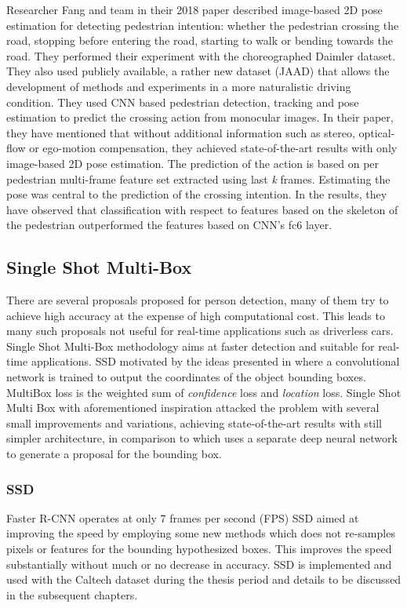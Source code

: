 \newpara
Researcher Fang and team in their 2018 paper \cite{fang2018pedestrian} described image-based 2D pose estimation for detecting pedestrian intention: whether the pedestrian crossing the road, stopping before entering the road, starting to walk or bending towards the road. They performed their experiment with the choreographed Daimler dataset. They also used publicly available, a rather new dataset (JAAD) \cite{kotseruba2016joint} that allows the development of methods and experiments in a more naturalistic driving condition. They used CNN based pedestrian detection, tracking and pose estimation to predict the crossing action from monocular images. In their paper, they have mentioned that without additional information such as stereo, optical-flow or ego-motion compensation, they achieved state-of-the-art results with only image-based 2D pose estimation. The prediction of the action is based on per pedestrian multi-frame feature set extracted using last \textit{k} frames. Estimating the pose was central to the prediction of the crossing intention. In the results, they have observed that classification with respect to features based on the skeleton of the pedestrian outperformed the features based on CNN's fc6 layer.

\subsection{Single Shot Multi-Box}
There are several proposals proposed for person detection, many of them try to achieve high accuracy at the expense of high computational cost. This leads to  many such proposals not useful for real-time applications such as driverless cars. Single Shot Multi-Box methodology aims at faster detection and suitable for real-time applications.  
SSD motivated by the ideas presented in \cite{szegedy2014scalable} where a convolutional network is trained to output the coordinates of the object bounding boxes. MultiBox loss is the weighted sum of \textit{confidence} loss and \textit{location} loss. Single Shot Multi Box with aforementioned inspiration attacked the problem with several small improvements and variations, achieving state-of-the-art results with still simpler architecture, in comparison to \cite{szegedy2014scalable} which uses a separate deep neural network to generate a proposal for the bounding box.

\subsubsection{SSD}
Faster R-CNN operates at only 7 frames per second (FPS) SSD aimed at improving the speed by employing some new methods which does not re-samples pixels or features for the bounding hypothesized boxes. This improves the speed substantially without much or no decrease in accuracy. SSD is implemented and used with the Caltech dataset \cite{dollar2009pedestrian} during the thesis period and details to be discussed in the subsequent chapters.

